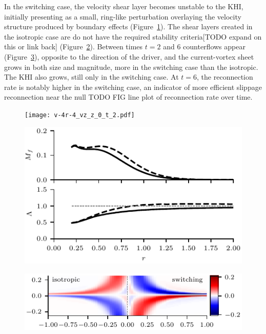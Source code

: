 In the switching case, the velocity shear layer becomes unstable to the KHI, initially presenting as a small, ring-like perturbation overlaying the velocity structure produced by boundary effects (Figure~\ref{fig:v-4r-4_vz_z_0_t_2}). The shear layers created in the isotropic case are do not have the required stability criteria[TODO expand on this or link back] (Figure~\ref{fig:v-4r-4_mach_t_2}). Between times $t=2$ and $6$ counterflows appear (Figure~\ref{fig:v-4r-4_counterflows_t_6}), opposite to the direction of the driver, and the current-vortex sheet grows in both size and magnitude, more in the switching case than the isotropic. The KHI also grows, still only in the switching case. At $t=6$, the reconnection rate is notably higher in the switching case, an indicator of more efficient slippage reconnection near the null TODO FIG line plot of reconnection rate over time.

\begin{figure}[t]
  \centering
  \texttt{[image: v-4r-4\_vz\_z\_0\_t\_2.pdf]}
  \caption{}%
  \label{fig:v-4r-4_vz_z_0_t_2}
\end{figure}

\begin{figure}[t]
  \centering
  \includegraphics[width=0.9\linewidth]{v-4r-4_mach_t_2.pdf}
  \caption{}%
  \label{fig:v-4r-4_mach_t_2}
\end{figure}

\begin{figure}[t]
  \centering
  \includegraphics[width=0.9\linewidth]{v-4r-4_counterflows_t_6.pdf}
  \caption{}%
  \label{fig:v-4r-4_counterflows_t_6}
\end{figure}

